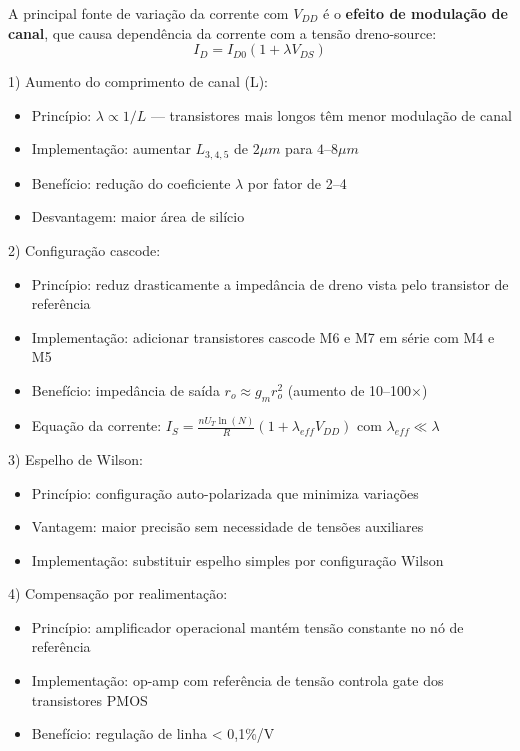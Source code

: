﻿\documentclass[12pt,a4paper]{article}
\begin{document}
A principal fonte de variação da corrente com $V_{DD}$ é o \textbf{efeito de modulação de canal}, que causa dependência da corrente com a tensão dreno-source:
$$I_D = I_{D0}(1 + \lambda V_{DS}) $$



1) Aumento do comprimento de canal (L):
\begin{itemize}
    \item Princípio: $\lambda \propto 1/L$ — transistores mais longos têm menor modulação de canal
    \item Implementação: aumentar $L_{3,4,5}$ de $2\mu m$ para $4$–$8\mu m$
    \item Benefício: redução do coeficiente $\lambda$ por fator de 2–4
    \item Desvantagem: maior área de silício
\end{itemize}

2) Configuração cascode:
\begin{itemize}
    \item Princípio: reduz drasticamente a impedância de dreno vista pelo transistor de referência
    \item Implementação: adicionar transistores cascode M6 e M7 em série com M4 e M5
    \item Benefício: impedância de saída $r_o \approx g_m r_o^2$ (aumento de 10–100×)
    \item Equação da corrente: $I_S = \frac{nU_T \ln(N)}{R}(1 + \lambda_{eff} V_{DD})$ com $\lambda_{eff} \ll \lambda$
\end{itemize}

3) Espelho de Wilson:
\begin{itemize}
    \item Princípio: configuração auto-polarizada que minimiza variações
    \item Vantagem: maior precisão sem necessidade de tensões auxiliares
    \item Implementação: substituir espelho simples por configuração Wilson
\end{itemize}

4) Compensação por realimentação:
\begin{itemize}
    \item Princípio: amplificador operacional mantém tensão constante no nó de referência
    \item Implementação: op-amp com referência de tensão controla gate dos transistores PMOS
    \item Benefício: regulação de linha < 0,1\%/V
\end{itemize}
\end{document}
